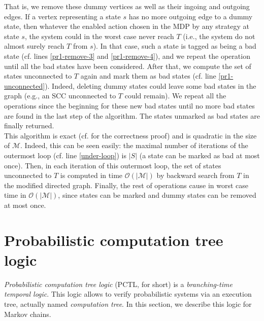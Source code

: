 That is, we remove these dummy vertices as well as their ingoing and outgoing edges.
If a vertex representing a state $s$ has no more outgoing edge to a dummy state, then whatever the enabled action chosen in the MDP by any strategy at state $s$, the system could in the worst case never reach $T$ (i.e., the system do not almost surely reach $T$ from $s$).
In that case, such a state is tagged as being a bad state (cf. lines \ref{pr1-remove-3} and \ref{pr1-remove-4}), and we repeat the operation until all the bad states have been considered.
After that, we compute the set of states unconnected to $T$ again and mark them as bad states (cf. line \ref{pr1-unconnected}).
Indeed, deleting dummy states could leave some bad states in the graph (e.g., an SCC unconnected to $T$ could remain).
We repeat all the operations since the beginning for these new bad states until no more bad states are found in the last step of the algorithm.
The states unmarked as bad states are finally returned.\\

This algorithm is exact (cf. \cite{PMC} for the correctness proof) and is quadratic in the size of $\mathcal{M}$.
Indeed, this can be seen easily: the maximal number of iterations of the outermost loop (cf. line \ref{under-loop}) is $|S|$ (a state can be marked as bad at most once).
Then, in each iteration of this outermost loop, the set of states unconnected to $T$ is computed in time $\mathcal{O}(|\mathcal{M}|)$ by backward search from $T$ in the modified directed graph.
Finally, the rest of operations cause in worst case time in $\mathcal{O}(|\mathcal{M}|)$, since states can be marked and dummy states can be removed at most once.

\section{Probabilistic computation tree logic}\label{pctl-section}
\textit{Probabilistic computation tree logic} (PCTL, for short) is a \textit{branching-time temporal logic}.
This logic allows to verify probabilistic systems via an
execution tree, actually named \textit{computation tree}.
In this section, we describe this logic for Markov chains. \\

